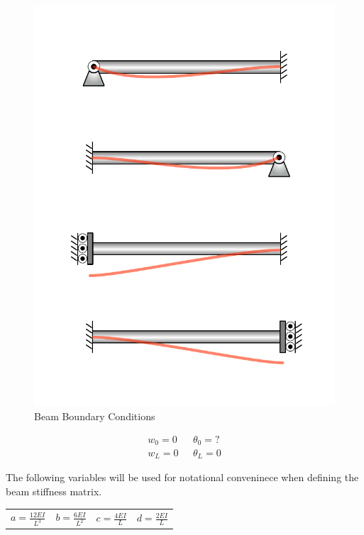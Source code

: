 \begin{figure}[H]
	\centerline{
		\includegraphics[width=0.8\columnwidth]{Figures/BCFrame}
		}
	\caption{Beam Boundary Conditions}
	\label{fig:BCFrame}
\end{figure}

\begin{align*}
	w_0=0 & \text{	} \theta_0=?\\
	w_L=0 &\text{	}  \theta_L=0
\end{align*}

The following variables will be used for notational conveninece when defining the beam stiffness matrix.

\begin{center}
	\begin{tabular}{cccc}
		$a=\frac{12EI}{L^3}$ & $b=\frac{6EI}{L^2}$ & $c=\frac{4EI}{L}$ & $d=\frac{2EI}{L}$
	\end{tabular}
\end{center}

